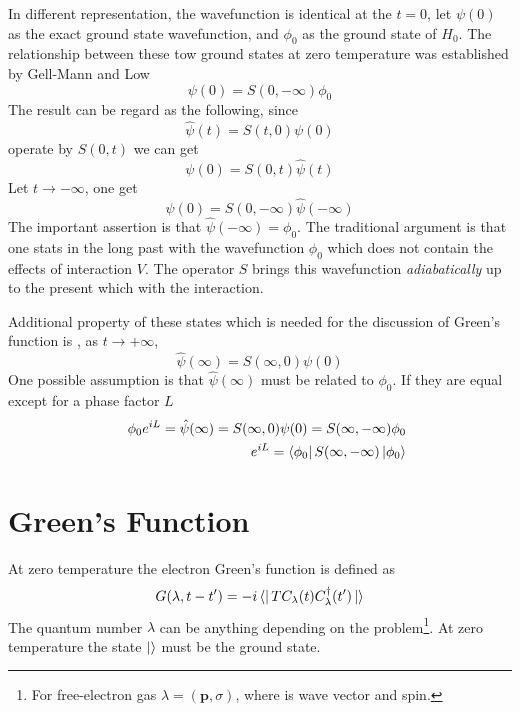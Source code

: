 In different representation, the wavefunction is identical at the $t=0$, let $\psi(0)$ as the exact ground state wavefunction, and $\phi_0$ as the ground state of $H_0$.
The relationship between these tow ground states at zero temperature was established by Gell-Mann and Low
\begin{equation}
  \psi(0) = S(0,-\infty)\phi_0 \label{2.36}
\end{equation}
The result can be regard as the following, since
\begin{equation}
  \hat{\psi}(t) = S(t,0) \psi(0)
\end{equation}
operate by $S(0,t)$ we can get
\begin{equation}
  \psi(0) = S(0,t) \hat{\psi}(t)
\end{equation}
Let $t \to -\infty$, one get
\begin{equation}
  \psi(0) = S(0,-\infty) \hat{\psi}(-\infty) \label{2.39}
\end{equation}
The important assertion is that $\hat{\psi}(-\infty)=\phi_0$.
The traditional argument is that one stats in the long past with the wavefunction $\phi_0$ which does not contain the effects of interaction $V$.
The operator $S$ brings this wavefunction \textit{adiabatically} up to the present which with the interaction.

Additional property of these states which is needed for the discussion of Green's function is , as $t\to +\infty$,
\begin{equation}
  \hat{\psi}(\infty) = S(\infty,0) \psi(0)  \label{2.40}
\end{equation}
One possible assumption is that $\hat{\psi}(\infty)$ must be related to $\phi_0$.
If they are equal except for a phase factor $L$
\begin{eqnarray}
  &&\phi_0 e^{iL} = \hat{\psi}(\infty) = S(\infty,0)\psi(0) = S(\infty,-\infty)\phi_0
  \label{2.41}\\
  &&e^{iL} = \bra{\phi_0} S(\infty,-\infty) \ket{\phi_0} \label{2.42}
\end{eqnarray}

\section{Green's Function}\label{s2.3}
At zero temperature the electron Green's function is defined as
\begin{equation}
  G(\lambda,t-t') = -i \bra{}TC_\lambda(t) C_\lambda^\dagger(t') \ket{} \label{2.43}
\end{equation}
The quantum number $\lambda$ can be anything depending on the problem\footnote{For free-electron gas $\lambda = (\mathbf{p},\sigma)$, where is wave vector and spin.}.
At zero temperature the state $\ket{}$ must be the ground state.

